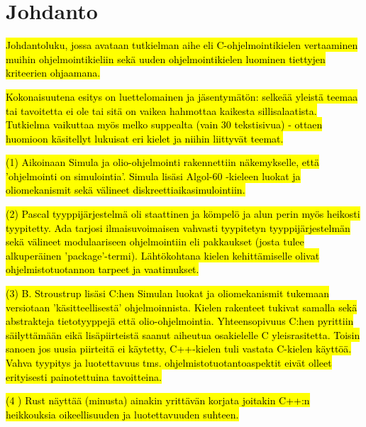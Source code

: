 \section{Johdanto}

\hl{Johdantoluku, jossa avataan tutkielman aihe eli C-ohjelmointikielen
vertaaminen muihin ohjelmointikieliin sekä uuden ohjelmointikielen luominen
tiettyjen kriteerien ohjaamana.}

\hl{Kokonaisuutena esitys on luettelomainen ja jäsentymätön: selkeää yleistä
teemaa tai tavoitetta ei ole tai sitä on vaikea hahmottaa kaikesta
sillisalaatista. Tutkielma vaikuttaa myös melko suppealta (vain 30 tekstisivua)
- ottaen huomioon käsitellyt lukuisat eri kielet ja niihin liittyvät teemat.}

\hl{ (1) Aikoinaan Simula ja olio-ohjelmointi rakennettiin näkemykselle, että
'ohjelmointi on simulointia'. Simula lisäsi Algol-60 -kieleen luokat ja
oliomekanismit sekä välineet diskreettiaikasimulointiin.}

\hl{(2) Pascal tyyppijärjestelmä oli staattinen ja kömpelö ja alun perin myös
heikosti tyypitetty.  Ada tarjosi ilmaisuvoimaisen vahvasti tyypitetyn
tyyppijärjestelmän sekä välineet modulaariseen ohjelmointiin eli pakkaukset
(josta tulee alkuperäinen 'package'-termi). Lähtökohtana kielen kehittämiselle
olivat ohjelmistotuotannon tarpeet ja vaatimukset.}

\hl{(3) B. Stroustrup lisäsi C:hen Simulan luokat ja oliomekanismit tukemaan
versiotaan 'käsitteellisestä' ohjelmoinnista.  Kielen rakenteet tukivat samalla
sekä abstrakteja tietotyyppejä että olio-ohjelmointia. Yhteensopivuus C:hen
pyrittiin säilyttämään eikä lisäpiirteistä saanut aiheutua osakielelle C
yleisrasitetta.  Toisin sanoen jos uusia piirteitä ei käytetty, C++-kielen tuli
vastata C-kielen käyttöä.  Vahva tyypitys ja luotettavuus tms.
ohjelmistotuotantoaspektit eivät olleet erityisesti painotettuina tavoitteina.}

\hl{ (4 ) Rust näyttää (minusta) ainakin yrittävän korjata joitakin C++:n
heikkouksia oikeellisuuden ja luotettavuuden suhteen.}

